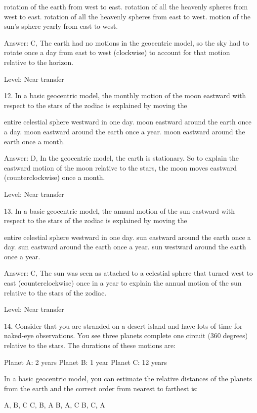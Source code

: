     rotation of the earth from west to east.
    rotation of all the heavenly spheres from west to east.
    rotation of all the heavenly spheres from east to west.
    motion of the sun's sphere yearly from east to west. 

Answer: C, The earth had no motions in the geocentric model, so the sky had to rotate once a day from east to west (clockwise) to account for that motion relative to the horizon.

Level: Near transfer

12. In a basic geocentric model, the monthly motion of the moon eastward with respect to the stars of the zodiac is explained by moving the

    entire celestial sphere westward in one day.
    moon eastward around the earth once a day.
    moon eastward around the earth once a year.
    moon eastward around the earth once a month. 

Answer: D, In the geocentric model, the earth is stationary. So to explain the eastward motion of the moon relative to the stars, the moon moves eastward (counterclockwise) once a month.

Level: Near transfer

13. In a basic geocentric model, the annual motion of the sun eastward with respect to the stars of the zodiac is explained by moving the

    entire celestial sphere westward in one day.
    sun eastward around the earth once a day.
    sun eastward around the earth once a year.
    sun westward around the earth once a year. 

Answer: C, The sun was seen as attached to a celestial sphere that turned west to east (counterclockwise) once in a year to explain the annual motion of the sun relative to the stars of the zodiac.

Level: Near transfer

14. Consider that you are stranded on a desert island and have lots of time for naked-eye observations. You see three planets complete one circuit (360 degrees) relative to the stars. The durations of these motions are:

    Planet A: 2 years
    Planet B: 1 year
    Planet C: 12 years

In a basic geocentric model, you can estimate the relative distances of the planets from the earth and the correct order from nearest to farthest is:

    A, B, C
    C, B, A
    B, A, C
    B, C, A 


